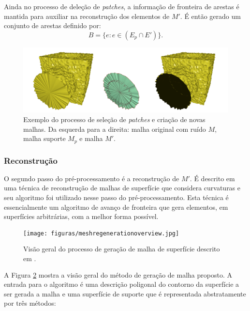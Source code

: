 Ainda no processo de deleção de \textit{patches}, a informação de fronteira de arestas é mantida para auxiliar na reconstrução dos elementos de $M'$. É então gerado um conjunto de arestas definido por:
\begin{equation} \label{eq:boundary} 
B = \{e : e \in (E_p \cap E')\}.
\end{equation}

\begin{figure}[!h]
\captionsetup{width=\linewidth}
\centering
\includegraphics[width=\linewidth]{figuras/meshparts.png}
\caption{Exemplo do processo de seleção de \textit{patches} e criação de novas malhas. Da esquerda para a direita: malha original com ruído $M$, malha suporte $M_p$ e malha $M'$.}
\label{fig:meshparts}
\end{figure}

\subsubsection{Reconstrução}

O segundo passo do pré-processamento é a reconstrução de $M'$. É descrito em \cite{miranda2009surface} uma técnica de reconstrução de malhas de superfície que considera curvaturas e seu algoritmo foi utilizado nesse passo do pré-processamento. Esta técnica é essencialmente um algoritmo de avanço de fronteira que gera elementos, em superfícies arbitrárias, com a melhor forma possível. 


\begin{figure}[!h]
\captionsetup{width=\linewidth}
\centering
\texttt{[image: figuras/meshregenerationoverview.jpg]}
\caption{Visão geral do processo de geração de malha de superfície descrito em \cite{miranda2009surface}.}
\label{fig:meshregeneration}
\end{figure}

A Figura \ref{fig:meshregeneration} mostra a visão geral do método de geração de malha proposto. A entrada para o algoritmo é uma descrição poligonal do contorno da superfície a ser gerada a malha e uma superfície de suporte que é representada abstratamente por três métodos:

